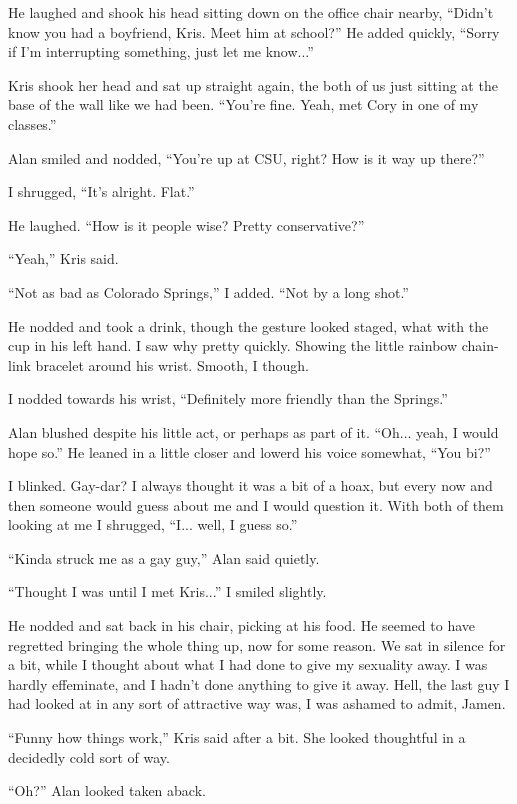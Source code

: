 He laughed and shook his head sitting down on the office chair nearby, ``Didn't know you had a boyfriend, Kris.  Meet him at school?''  He added quickly, ``Sorry if I'm interrupting something, just let me know...''

Kris shook her head and sat up straight again, the both of us just sitting at the base of the wall like we had been.  ``You're fine.  Yeah, met Cory in one of my classes.''

Alan smiled and nodded, ``You're up at CSU, right?  How is it way up there?''

I shrugged, ``It's alright.  Flat.''

He laughed.  ``How is it people wise?  Pretty conservative?''

``Yeah,''  Kris said.

``Not as bad as Colorado Springs,'' I added.  ``Not by a long shot.''

He nodded and took a drink, though the gesture looked staged, what with the cup in his left hand.  I saw why pretty quickly.  Showing the little rainbow chain-link bracelet around his wrist.  Smooth, I though.  

I nodded towards his wrist, ``Definitely more friendly than the Springs.''

Alan blushed despite his little act, or perhaps as part of it.  ``Oh... yeah, I would hope so.''  He leaned in a little closer and lowerd his voice somewhat, ``You bi?''

I blinked.  Gay-dar?  I always thought it was a bit of a hoax, but every now and then someone would guess about me and I would question it.  With both of them looking at me I shrugged, ``I... well, I guess so.''

``Kinda struck me as a gay guy,'' Alan said quietly.

``Thought I was until I met Kris...'' I smiled slightly.

He nodded and sat back in his chair, picking at his food.  He seemed to have regretted bringing the whole thing up, now for some reason.  We sat in silence for a bit, while I thought about what I had done to give my sexuality away.  I was hardly effeminate, and I hadn't done anything to give it away.  Hell, the last guy I had looked at in any sort of attractive way was, I was ashamed to admit, Jamen.

``Funny how things work,'' Kris said after a bit.  She looked thoughtful in a decidedly cold sort of way.

``Oh?'' Alan looked taken aback.

